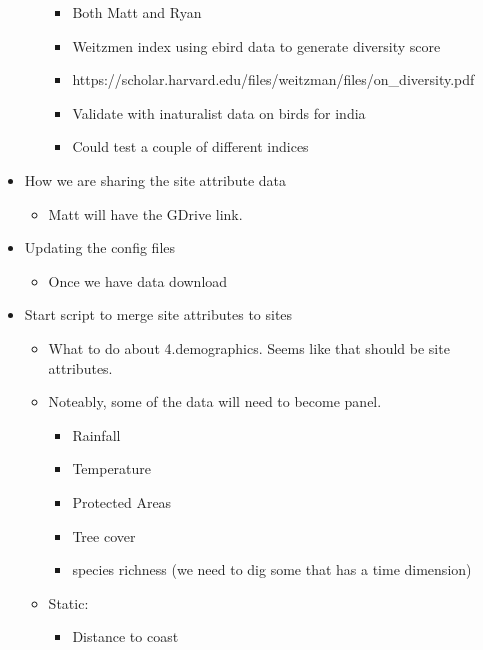 \documentclass[
  letterpaper,
]{article}
\providecommand{\tightlist}{%
  \setlength{\itemsep}{0pt}\setlength{\parskip}{0pt}}\usepackage{longtable,booktabs,array}
\begin{document}
\begin{tcolorbox}
\begin{itemize}
\begin{itemize}
    \begin{itemize}
    \tightlist
    \item
      Both Matt and Ryan
    \item
      Weitzmen index using ebird data to generate diversity score
    \item
      https://scholar.harvard.edu/files/weitzman/files/on\_diversity.pdf
    \item
      Validate with inaturalist data on birds for india
    \item
      Could test a couple of different indices
    \end{itemize}
  \end{itemize}
\item
  How we are sharing the site attribute data

  \begin{itemize}
  \tightlist
  \item
    Matt will have the GDrive link.
  \end{itemize}
\item
  Updating the config files

  \begin{itemize}
  \tightlist
  \item
    Once we have data download
  \end{itemize}
\item
  Start script to merge site attributes to sites

  \begin{itemize}
  \tightlist
  \item
    What to do about 4.demographics. Seems like that should be site
    attributes.
  \item
    Noteably, some of the data will need to become panel.

    \begin{itemize}
    \tightlist
    \item
      Rainfall
    \item
      Temperature
    \item
      Protected Areas
    \item
      Tree cover
    \item
      species richness (we need to dig some that has a time dimension)
    \end{itemize}
  \item
    Static:

    \begin{itemize}
    \tightlist
    \item
      Distance to coast
    \end{itemize}
  \end{itemize}
\end{itemize}

\end{tcolorbox}
\end{document}
